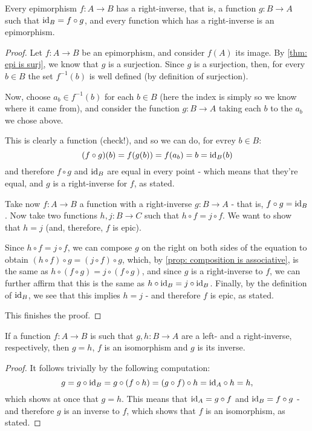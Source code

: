 \begin{lemma}\label{lem: epi right-inverse}
	Every epimorphism $f:A\to B$ has a right-inverse, that is, a function $g:B\to A$ such that ${\rm id}_B=f\circ g$, and every function which has a right-inverse is an epimorphism.
\end{lemma}
\begin{proof}
	Let $f:A\to B$ be an epimorphism, and consider $f(A)$ its image. By \cref{thm: epi is surj}, we know that $g$ is a surjection. Since $g$ is a surjection, then, for every $b\in B$ the set $f^{-1}(b)$ is well defined (by definition of surjection).
	
	Now, choose $a_b\in f^{-1}(b)$ for each $b\in B$ (here the index is simply so we know where it came from), and consider the function $g:B\to A$ taking each $b$ to the $a_b$ we chose above.
	
	This is clearly a function (check!), and so we can do, for evrey $b\in B$:
	\[(f\circ g)(b)=f(g(b))=f(a_b)=b={\rm id}_B(b)\]and therefore $f\circ g$ and ${\rm id}_B$ are equal in every point - which means that they're equal, and $g$ is a right-inverse for $f$, as stated.
	
	\bigskip
	Take now $f:A\to B$ a function with a right-inverse $g:B\to A$ - that is, $f\circ g={\rm id}_B$. Now take two functions $h,j:B\to C$ such that $h\circ f=j\circ f$. We want to show that $h=j$ (and, therefore, $f$ is epic).
	
	Since $h\circ f=j\circ f$, we can compose $g$ on the right on both sides of the equation to obtain $(h\circ f)\circ g=(j\circ f)\circ g$, which, by \cref{prop: composition is associative}, is the same as $h\circ(f\circ g)=j\circ(f\circ g)$, and since $g$ is a right-inverse to $f$, we can further affirm that this is the same as $h\circ{\rm id}_B=j\circ{\rm id}_B$. Finally, by the definition of ${\rm id}_B$, we see that this implies $h=j$ - and therefore $f$ is epic, as stated.
	
	This finishes the proof.
\end{proof}

\begin{lemma}\label{lem:left- = right-inverse}
	If a function $f:A\to B$ is such that $g,h:B\to A$ are a left- and a right-inverse, respectively, then $g=h$, $f$ is an isomorphism and $g$ is its inverse.
\end{lemma}
\begin{proof}
	It follows trivially by the following computation:
	\[g=g\circ{\rm id}_B=g\circ(f\circ h)=(g\circ f)\circ h={\rm id}_A\circ h=h,\]which shows at once that $g=h$. This means that ${\rm id}_A=g\circ f$ and ${\rm id}_B=f\circ g$ - and therefore $g$ is an inverse to $f$, which shows that $f$ is an isomorphism, as stated.
\end{proof}

